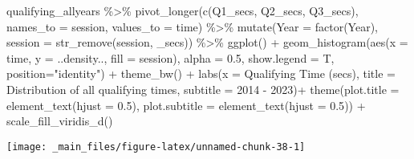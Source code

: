 \documentclass[
]{book}
\newenvironment{Shaded}{\begin{snugshade}}{\end{snugshade}}
\newcommand{\AttributeTok}[1]{\textcolor[rgb]{0.77,0.63,0.00}{#1}}
\newcommand{\FloatTok}[1]{\textcolor[rgb]{0.00,0.00,0.81}{#1}}
\newcommand{\FunctionTok}[1]{\textcolor[rgb]{0.00,0.00,0.00}{#1}}
\newcommand{\NormalTok}[1]{#1}
\newcommand{\SpecialCharTok}[1]{\textcolor[rgb]{0.00,0.00,0.00}{#1}}
\newcommand{\StringTok}[1]{\textcolor[rgb]{0.31,0.60,0.02}{#1}}
\begin{document}
\begin{Shaded}
\begin{Highlighting}[]
\NormalTok{qualifying\_allyears }\SpecialCharTok{\%\textgreater{}\%}
  \FunctionTok{pivot\_longer}\NormalTok{(}\FunctionTok{c}\NormalTok{(}\StringTok{\textquotesingle{}Q1\_secs\textquotesingle{}}\NormalTok{, }\StringTok{\textquotesingle{}Q2\_secs\textquotesingle{}}\NormalTok{, }\StringTok{\textquotesingle{}Q3\_secs\textquotesingle{}}\NormalTok{),}
               \AttributeTok{names\_to =} \StringTok{\textquotesingle{}session\textquotesingle{}}\NormalTok{,}
               \AttributeTok{values\_to =} \StringTok{\textquotesingle{}time\textquotesingle{}}\NormalTok{) }\SpecialCharTok{\%\textgreater{}\%}
  \FunctionTok{mutate}\NormalTok{(}\AttributeTok{Year =} \FunctionTok{factor}\NormalTok{(Year),}
         \AttributeTok{session =} \FunctionTok{str\_remove}\NormalTok{(session, }\StringTok{\textquotesingle{}\_secs\textquotesingle{}}\NormalTok{)) }\SpecialCharTok{\%\textgreater{}\%}
  \FunctionTok{ggplot}\NormalTok{() }\SpecialCharTok{+}
  \FunctionTok{geom\_histogram}\NormalTok{(}\FunctionTok{aes}\NormalTok{(}\AttributeTok{x =}\NormalTok{ time, }\AttributeTok{y =}\NormalTok{ ..density.., }\AttributeTok{fill =}\NormalTok{ session),}
                 \AttributeTok{alpha =} \FloatTok{0.5}\NormalTok{, }\AttributeTok{show.legend =}\NormalTok{ T,}
                 \AttributeTok{position=}\StringTok{"identity"}\NormalTok{) }\SpecialCharTok{+}
  \FunctionTok{theme\_bw}\NormalTok{() }\SpecialCharTok{+}
  \FunctionTok{labs}\NormalTok{(}\AttributeTok{x =} \StringTok{\textquotesingle{}Qualifying Time (secs)\textquotesingle{}}\NormalTok{,}
       \AttributeTok{title =} \StringTok{\textquotesingle{}Distribution of all qualifying times\textquotesingle{}}\NormalTok{,}
       \AttributeTok{subtitle =} \StringTok{\textquotesingle{}2014 {-} 2023\textquotesingle{}}\NormalTok{)}\SpecialCharTok{+}
  \FunctionTok{theme}\NormalTok{(}\AttributeTok{plot.title =} \FunctionTok{element\_text}\NormalTok{(}\AttributeTok{hjust =} \FloatTok{0.5}\NormalTok{),}
        \AttributeTok{plot.subtitle =} \FunctionTok{element\_text}\NormalTok{(}\AttributeTok{hjust =} \FloatTok{0.5}\NormalTok{)) }\SpecialCharTok{+}
  \FunctionTok{scale\_fill\_viridis\_d}\NormalTok{()}
\end{Highlighting}
\end{Shaded}

\begin{center}\texttt{[image: \_main\_files/figure-latex/unnamed-chunk-38-1]} \end{center}
\end{document}

